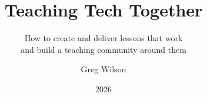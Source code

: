 \documentclass[]{tex/krantz}
\begin{document}
\title{Teaching Tech Together}
\subtitle{How to create and deliver lessons that work\\ and build a teaching community around them}
\author{Greg Wilson}
\date{2026}
\maketitle

\frontmatter

\tableofcontents


\mainmatter
















\cleardoublepage

\printbibliography

\appendix










\printindex
\end{document}
